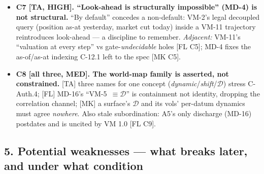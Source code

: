 \begin{itemize}
  model-mark's bit-for-bit claim (VM-8, VM-11) rests on it. C-Auth.3 requires amending the
  Constitution first.
  \item \textbf{C7 [TA, HIGH]. ``Look-ahead is structurally impossible'' (MD-4) is not
  structural.} ``By default'' concedes a non-default: VM-2's legal decoupled query (position
  as-at yesterday, market cut today) inside a VM-11 trajectory reintroduces look-ahead ---
  a discipline to remember. \emph{Adjacent:} VM-11's ``valuation at every step'' vs
  gate-\emph{undecidable} holes [FL C5]; MD-4 fixes the as-of/as-at indexing C-12.1 left to the
  spec [MK C5].
  \item \textbf{C8 [all three, MED]. The world-map family is asserted, not constrained.} [TA]
  three names for one concept (\emph{dynamic}/\emph{shift}/$\mathcal{D}$) stress C-Auth.4; [FL]
  MD-16's ``VM-5~$\equiv\mathcal{D}$'' is containment not identity, dropping the correlation
  channel; [MK] a surface's $\mathcal{D}$ and its vols' per-datum dynamics must agree
  \emph{nowhere}. Also stale subordination: A5's only discharge (MD-16) postdates and is uncited
  by VM 1.0 [FL C9].
\end{itemize}

\subsection*{5. Potential weaknesses --- what breaks later, and under what condition}

